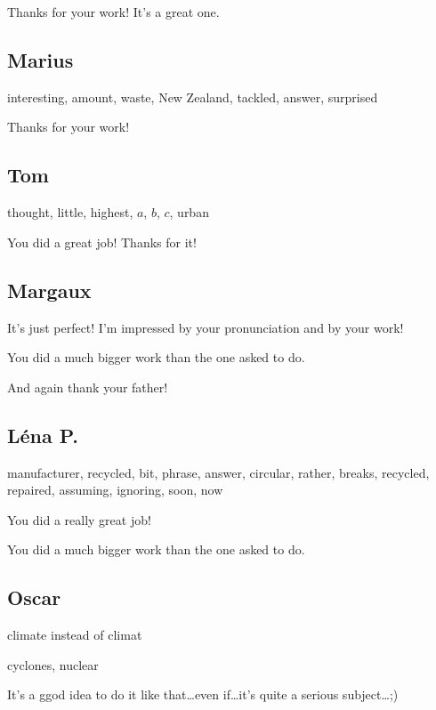 \documentclass[12pt,oneside]{report}
\begin{document}
\begin{spacing}{1.2}
Thanks for your work! It's a great one.
\color{black}

\subsection*{Marius}

interesting, amount, waste, New Zealand, tackled, answer, surprised

\color{blue}
Thanks for your work!
\color{black}

\subsection*{Tom}

thought, little, highest, $a$, $b$, $c$, urban

\color{blue}
You did a great job! Thanks for it!
\color{black}

\subsection*{Margaux}

\color{blue}
It's just perfect! I'm impressed by your pronunciation and by your work!

You did a much bigger work than the one asked to do.

And again thank your father!
\color{black}

\subsection*{Léna P.}

manufacturer, recycled, bit, phrase, answer, circular, rather, breaks, recycled, repaired, assuming, ignoring, soon, now

\color{blue}
You did a really great job!

You did a much bigger work than the one asked to do.
\color{black}

\subsection*{Oscar}

\color{blue}
climate instead of \og climat \fg{} 
\color{black}

cyclones, nuclear

\color{blue}
It's a ggod idea to do it like that\dots even if\dots it's quite a serious subject\dots ;)
\color{black}



\end{spacing}
\end{document}
